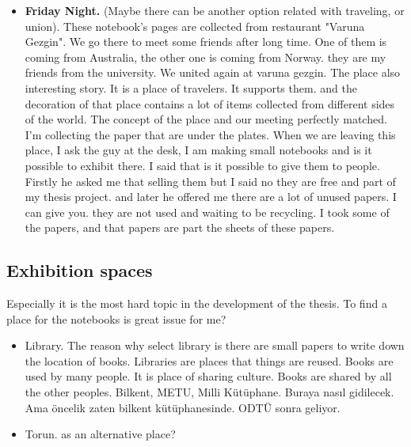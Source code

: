 \begin{itemize}
\item \textbf{Friday Night.} (Maybe there can be another option related with traveling, or union). These notebook's pages are collected from restaurant "Varuna Gezgin". We go there to meet some friends after long time. One of them is coming from Australia, the other one is coming from Norway. they are my friends from the university. We united again at varuna gezgin. The place also interesting story. It is a place of travelers. It supports them. and the decoration of that place contains a lot of items collected from different sides of the world. The concept of the place and our meeting perfectly matched. I'm collecting the paper that are under the plates. When we are leaving this place, I ask the guy at the desk, I am making small notebooks and is it possible to exhibit there. I said that is it possible to give them to people. Firstly he asked me that selling them but I said no they are free and part of my thesis project. and later he offered me there are a lot of unused papers. I can give you. they are not used and waiting to be recycling. I took some of the papers, and that papers are part the sheets of these papers. 



\end{itemize}

\subsection{Exhibition spaces}
Especially it is the most hard topic in the development of the thesis. To find a place for the notebooks is great issue for me? 

\begin{itemize}
\item Library. The reason why select library is there are small papers to write down the location of books. Libraries are places that things are reused. Books are used by many people. It is place of sharing culture. Books are shared by all the other peoples. 
Bilkent, METU, Milli Kütüphane. Buraya nasıl gidilecek. Ama öncelik zaten bilkent kütüphanesinde. ODTÜ sonra geliyor. 
\item Torun. as an alternative place?
\end{itemize}

